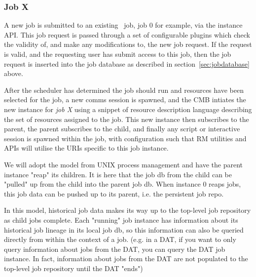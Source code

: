 \subsubsection{Job X}

A new job is submitted to an existing \ngrm\ job, job 0 for example,
via the instance API. This job request is passed through a set of
configurable plugins which check the validity of, and make any
modifications to, the new job request. If the request is valid,
and the requesting user has submit access to this job, then
the job request is inserted into the job database as described
in section~\ref{sec:jobdatabase} above.

After the scheduler has determined the job should run and
resources have been selected for the job, a new comms session
is spawned, and the CMB intiates the new instance for \emph{job X}
using a snippet of resource description language describing
the set of resources assigned to the job. This new instance
then subscribes to the parent, the parent subscribes to the
child, and finally any script or interactive session is spawned
within the job, with configuration such that RM utilities and
APIs will utilise the URIs specific to this job instance.

\ifcomments
{}



We will adopt the model from UNIX process management and have the
parent instance "reap" its children. It is here that the job db from
the child can be "pulled" up from the child into the parent job db.
When instance 0 reaps jobs, this job data can be pushed up to its
parent, i.e. the persistent job repo.

\ifcomments
{}
\fi

In this model, historical job data makes its way up to the top-level
job repository as child jobs complete. Each "running" job instance has
information about its historical job lineage in its local job db, so
this information can also be queried directly from within the context
of a job. (e.g. in a DAT, if you want to only query information about
jobs from the DAT, you can query the DAT job instance. In fact,
information about jobs from the DAT are not populated to the top-level
job repository until the DAT "ends")

